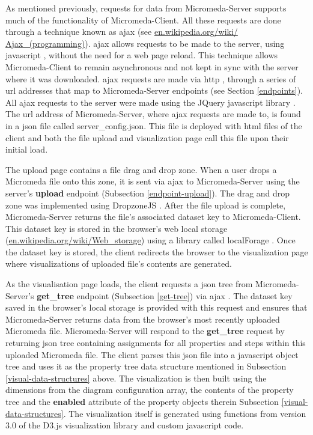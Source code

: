 As mentioned previously, requests for data from Micromeda-Server supports much of the functionality of Micromeda-Client. All these requests are done through a technique known as \gls{ajax} \cite{garrett2005ajax,li2012jquery} (see \href{http://en.wikipedia.org/wiki/Ajax_(programming)}{en.wikipedia.org/wiki/ Ajax\_(programming)}). \gls{ajax}  allows requests to be made to the server, using \gls{javascript} \cite{flanagan2006javascript}, without the need for a web page reload. This technique allows Micromeda-Client to remain asynchronous and not kept in sync with the server where it was downloaded. \gls{ajax}  requests are made via \gls{http} \cite{fielding1999hypertext}, through a series of \gls{url} addresses \cite{berners1994rfc} that map to Micromeda-Server endpoints (see Section \ref{endpoints}). All \gls{ajax}  requests to the server were made using the JQuery \gls{javascript} library \cite{chaffer2013learning,li2012jquery}. The \gls{url} address of Micromeda-Server, where \gls{ajax}  requests are made to, is found in a \gls{json} file called server\_config.json. This file is deployed with \gls{html} files of the client and both the file upload and visualization page call this file upon their initial load.

The upload page contains a file drag and drop zone. When a user drops a Micromeda file onto this zone, it is sent via \gls{ajax}  to Micromeda-Server using the server's \textbf{upload} endpoint (Subsection \ref{endpoint-upload}). The drag and drop zone was implemented using DropzoneJS \cite{meno}. After the file upload is complete, Micromeda-Server returns the file's associated dataset key to Micromeda-Client. This dataset key is stored in the browser's web local storage \cite{Hickson} (\href{http://en.wikipedia.org/wiki/Web_storage}{en.wikipedia.org/wiki/Web\_storage}) using a library called localForage \cite{localforage}. Once the dataset key is stored, the client redirects the browser to the visualization page where visualizations of uploaded file's contents are generated.

As the visualisation page loads, the client requests a \gls{json} tree from Micromeda-Server's \textbf{get\_tree} endpoint (Subsection \ref{get-tree}) via \gls{ajax} . The dataset key saved in the browser's local storage is provided with this request and ensures that Micromeda-Server returns data from the browser's most recently uploaded Micromeda file. Micromeda-Server will respond to the \textbf{get\_tree} request by returning \gls{json} tree containing assignments for all properties and steps within this uploaded Micromeda file. The client parses this \gls{json} file into a \gls{javascript} object tree and uses it as the property tree data structure mentioned in Subsection \ref{visual-data-structures} above. The visualization is then built using the dimensions from the diagram configuration array, the contents of the property tree and the \textbf{enabled} attribute of the property objects therein Subsection \ref{visual-data-structures}. The visualization itself is generated using functions from version 3.0 of the D3.js visualization library \cite{bostock2015d3} and custom \gls{javascript} code.

